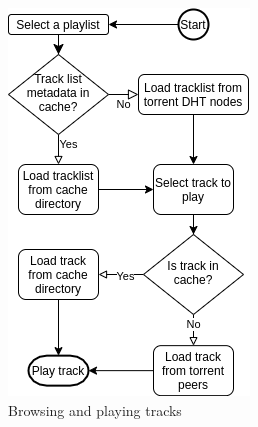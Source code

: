 \begin{figure}
        \includegraphics[width=1\linewidth]{implementation/playing_track.png}
        \caption{Browsing and playing tracks}
        \label{fig:playing-tracks}
    \endminipage\hfill

\end{figure}
